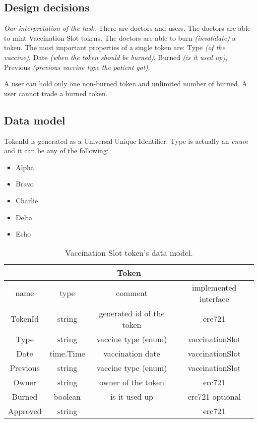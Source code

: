 \newcommand{\function}[4]{
  \textbf{#1} (\emph{#2}): #3 \newline
  \emph{\color{teal} #4}
}


\subsection{Design decisions}
\emph{Our interpretation of the task.} There are doctors and users. The doctors are able to mint Vaccination Slot tokens. The doctors are able to burn \emph{(invalidate)} a token. The most important properties of a single token are: Type \emph{(of the vaccine)}, Date \emph{(when the token should be burned)}, Burned \emph{(is it used up)}, Previous \emph{(previous vaccine type the patient got)}.

A user can hold only one non-burned token and unlimited number of burned. A user cannot trade a burned token.


\subsection{Data model}
TokenId is generated as a Universal Unique Identifier. Type is actually an \emph{enum} and it can be any of the following:
\begin{itemize}
  \item Alpha
  \item Bravo
  \item Charlie
  \item Delta
  \item Echo
\end{itemize}

\begin{center}
  \begin{table}[!ht]
    \centering
    \begin{tabular}{|c | c | c | c |}
      \hline
      \multicolumn{4}{|c|}{Token}                                              \\
      \hline
      name     & type      & comment                   & implemented interface \\
      \hline
      TokenId  & string    & generated id of the token & erc721                \\
      Type     & string    & vaccine type (enum)       & vaccinationSlot       \\
      Date     & time.Time & vaccination date          & vaccinationSlot       \\
      Previous & string    & vaccine type (enum)       & vaccinationSlot       \\
      Owner    & string    & owner of the token        & erc721                \\
      Burned   & boolean   & is it used up             & erc721 optional       \\
      Approved & string    &                           & erc721                \\
      \hline
    \end{tabular}
    \caption{Vaccination Slot token's data model.}
  \end{table}
\end{center}


